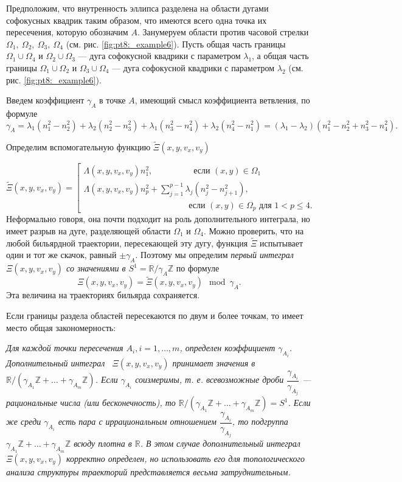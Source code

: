Предположим, что внутренность эллипса разделена на области дугами софокусных квадрик таким образом, что имеются всего одна точка их пересечения, которую обозначим $A$.
Занумеруем области против часовой стрелки $\Omega_1, \ \Omega_2, \ \Omega_3, \ \Omega_4$ (см. рис. \ref{fig:pt8:_example6}).
Пусть общая часть границы $\Omega_1 \cup \Omega_4$ и $\Omega_2 \cup \Omega_3$ --- дуга софокусной квадрики с параметром $\lambda_1$, а общая часть границы $\Omega_1 \cup \Omega_2$ и $\Omega_3 \cup \Omega_4$ --- дуга софокусной квадрики с параметром $\lambda_2$ (см. рис. \ref{fig:pt8:_example6}).

Введем коэффициент $\gamma_A$ в точке $A$, имеющий смысл коэффициента ветвления, по формуле $$\gamma_A = \lambda_1(n_1^2 - n_2^2) + \lambda_2(n_2^2-n_3^2) + \lambda_1(n_3^2-n_4^2) + \lambda_2(n_4^2-n_1^2) = (\lambda_1 - \lambda_2) ( n_1^2 - n_2^2 + n_3^2 - n_4^2).$$

Определим вспомогательную функцию $\widetilde{\Xi}(x, y, v_x, v_y)$ 

\begin{equation*}
\widetilde{\Xi}(x, y, v_x, v_y) = \left[
\begin{array}{ll}
    \Lambda(x, y, v_x, v_y) n_1^2, \qquad  \  \ \qquad   \text{ если } (x,y) \in \Omega_1 
    \\
    \Lambda(x, y, v_x, v_y) n_p^2 + \sum_{j=1}^{p-1} \lambda_j(n_j^2-n_{j+1}^2), \\
     \qquad \qquad \qquad \qquad \qquad \qquad  \text{ если } (x,y) \in \Omega_p \text{ для } 1 < p \leq 4. 
\end{array}
\right.
\end{equation*}
Неформально говоря, она почти подходит на роль дополнительного интеграла, но имеет разрыв на дуге, разделяющей области $\Omega_1$ и $\Omega_4$. Можно проверить, что на любой бильярдной траектории, пересекающей эту дугу, функция $\widetilde{\Xi}$ испытывает один и тот же скачок, равный  $\pm \gamma_A$. 
Поэтому мы определим \textit{первый интеграл $\Xi(x, y, v_x, v_y)$ со значениями в $S^1= \mathbb{R}/\gamma_A \mathbb{Z}$ }по формуле $$\Xi(x, y, v_x, v_y) = \widetilde{\Xi}(x, y, v_x, v_y) \mod \gamma_A.$$
Эта величина на траекториях бильярда сохраняется.
\bigskip

Если границы раздела областей пересекаются по двум и более точкам, то имеет место общая закономерность: 
\medskip

{\it 
\noindent Для каждой точки пересечения $A_i, i=1,\ldots,m$, определен коэффициент $\gamma_{A_i}$. Дополнительный интеграл \  $\Xi(x, y, v_x, v_y)$ принимает значения в $\mathbb{R}/(\gamma_{A_1} \mathbb{Z}+ \ldots + \gamma_{A_m} \mathbb{Z})$. Если $\gamma_{A_i}$ соизмеримы, т. е. всевозможные дроби $\dfrac{\gamma_{A_i}}{\gamma_{A_j}}$ --- рациональные числа (или бесконечность), то $\mathbb{R}/(\gamma_{A_1} \mathbb{Z}+ \ldots + \gamma_{A_m} \mathbb{Z}) = S^1$. Если же среди $\gamma_{A_i}$ есть пара с иррациональным отношением $\dfrac{\gamma_{A_i}}{\gamma_{A_j}}$, то подгруппа $\gamma_{A_1} \mathbb{Z}+ \ldots + \gamma_{A_m} \mathbb{Z}$ всюду плотна в $\mathbb{R}$. В этом случае дополнительный интеграл $\Xi(x, y, v_x, v_y)$ корректно определен, но использовать его для топологического анализа структуры траекторий представляется весьма затруднительным.}


